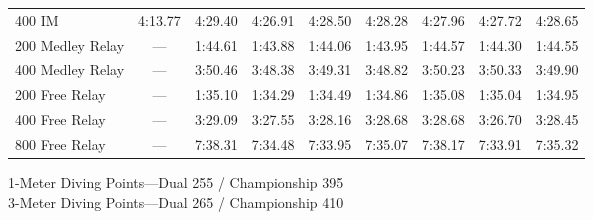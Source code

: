 \begin{table}[H]
\begin{tabularx}{\textwidth}{lccrrrrrr}
400 IM & 4:13.77 & 4:29.40 & 4:26.91 & 4:28.50 & 4:28.28 & 4:27.96 & 4:27.72 & 4:28.65 \\
\rowcolor{teamprimary!8}
200 Medley Relay & --- & 1:44.61 & 1:43.88 & 1:44.06 & 1:43.95 & 1:44.57 & 1:44.30 & 1:44.55 \\
\rowcolor{teamsecondary!12}
400 Medley Relay & --- & 3:50.46 & 3:48.38 & 3:49.31 & 3:48.82 & 3:50.23 & 3:50.33 & 3:49.90 \\
\rowcolor{teamprimary!8}
200 Free Relay & --- & 1:35.10 & 1:34.29 & 1:34.49 & 1:34.86 & 1:35.08 & 1:35.04 & 1:34.95 \\
\rowcolor{teamsecondary!12}
400 Free Relay & --- & 3:29.09 & 3:27.55 & 3:28.16 & 3:28.68 & 3:28.68 & 3:26.70 & 3:28.45 \\
\rowcolor{teamprimary!8}
800 Free Relay & --- & 7:38.31 & 7:34.48 & 7:33.95 & 7:35.07 & 7:38.17 & 7:33.91 & 7:35.32 \\
\bottomrule
\end{tabularx}

\vspace{0.5em}
\small{1-Meter Diving Points—Dual 255 / Championship 395 \\
3-Meter Diving Points—Dual 265 / Championship 410}
\end{table}
